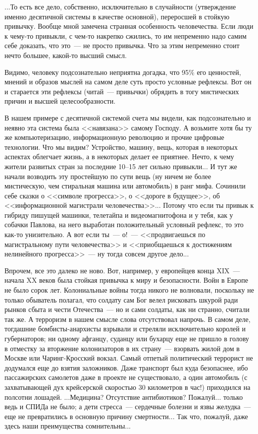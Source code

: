 \documentclass{scrbook}
\newcommand{\flqq}{<<}
\newcommand{\frqq}{>>}
\newcommand{\mdash}{~--- }
\newcommand{\ndash}{--}
\begin{document}
...То есть все дело, собственно, исключительно в случайности (утверждение именно десятичной системы в качестве основной), переросшей в стойкую привычку. Вообще мной замечена странная особенность человечества. Если люди к чему-то привыкли, с чем-то накрепко сжились, то им непременно надо самим себе доказать, что это{\mdash}не просто привычка. Что за этим непременно стоит нечто большее, какой-то высший смысл.

Видимо, человеку подсознательно неприятна догадка, что 95\% его ценностей, мнений и образов мыслей на самом деле суть просто условные рефлексы. Вот он и старается эти рефлексы (читай{\mdash}привычки) обрядить в тогу мистических причин и высшей целесообразности.

В нашем примере с десятичной системой счета мы видели, как подсознательно и неявно эта система была {\flqq}навязана{\frqq} самому Господу. А возьмите хотя бы ту же компьютеризацию, информационную революцию и прочие цифровые технологии. Что мы видим? Устройство, машину, вещь, которая в некоторых аспектах облегчает жизнь, а в некоторых делает ее приятнее. Нечто, к чему жители развитых стран за последние 10{\ndash}15 лет сильно привыкли... И тут же начали возводить эту простейшую по сути вещь (ну ничем не более мистическую, чем стиральная машина или автомобиль) в ранг мифа. Сочинили себе сказки о {\flqq}символе прогресса{\frqq}, о {\flqq}дороге в будущее{\frqq}, об {\flqq}информационной магистрали человечества{\frqq}... Потому что если ты привык к гибриду пишущей машинки, телетайпа и видеомагнитофона и у тебя, как у собачки Павлова, на него выработан положительный условный рефлекс, то это как-то унизительно. А вот если ты{\mdash}о!{\mdash}{\flqq}продвигаешься по магистральному пути человечества{\frqq} и {\flqq}приобщаешься к достижениям нелинейного прогресса{\frqq}{\mdash}ну тогда совсем другое дело...

Впрочем, все это далеко не ново. Вот, например, у европейцев конца XIX{\mdash}начала XX веков была стойкая привычка к миру и безопасности. Войн в Европе не было сорок лет. Колониальные войны тогда никого не волновали, поскольку не только обыватель полагал, что солдату сам Бог велел рисковать шкурой ради рынков сбыта и чести Отечества{\mdash}но и сами солдаты, как ни странно, считали так же. А терроризм в нашем смысле слова отсутствовал напрочь. В самом деле, тогдашние бомбисты-анархисты взрывали и стреляли исключительно королей и губернаторов; ни одному афганцу, суданцу или бухарцу еще не пришло в голову в отместку за вторжение колонизаторов в их страну{\mdash}взорвать жилой дом в Москве или Чаринг-Кросский вокзал. Самый отпетый политический террорист не додумался еще до взятия заложников. Даже транспорт был куда безопаснее, ибо пассажирских самолетов даже в проекте не существовало, а один автомобиль (с захватывающей дух крейсерской скоростью 30 километров в час!) приходился на полсотни лошадей.
...Медицина? Отсутствие антибиотиков? Пожалуй... только ведь и СПИДа не было; а дети стресса{\mdash}сердечные болезни и язвы желудка{\mdash}еще не превратились в основную причину смертности... Так что, пожалуй, даже здесь наши преимущества сомнительны...
\end{document}
